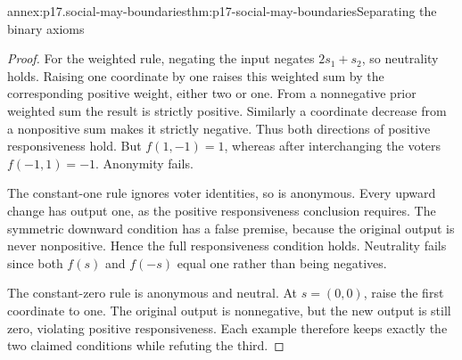 \begin{annexitem}{annex:p17.social-may-boundaries}{thm:p17-social-may-boundaries}{Separating the binary axioms}
\begin{proof}
For the weighted rule, negating the input negates \(2s_1+s_2\), so
neutrality holds. Raising one coordinate by one raises this weighted
sum by the corresponding positive weight, either two or one. From
a nonnegative prior weighted sum the result is strictly positive.
Similarly a coordinate decrease from a nonpositive sum makes it
strictly negative. Thus both directions of positive responsiveness hold.
But \(f(1,-1)=1\), whereas after interchanging the voters
\(f(-1,1)=-1\). Anonymity fails.

The constant-one rule ignores voter identities, so is anonymous.
Every upward change has output one, as the positive responsiveness
conclusion requires. The symmetric downward condition has a false
premise, because the original output is never nonpositive.
Hence the full responsiveness condition holds. Neutrality fails since
both \(f(s)\) and \(f(-s)\) equal one rather than being negatives.

The constant-zero rule is anonymous and neutral. At \(s=(0,0)\),
raise the first coordinate to one. The original output is nonnegative,
but the new output is still zero, violating positive responsiveness.
Each example therefore keeps exactly the two claimed conditions while
refuting the third.
\end{proof}
\end{annexitem}
